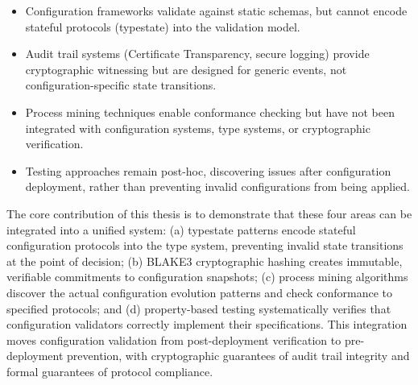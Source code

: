 \begin{itemize}
    \item Configuration frameworks validate against static schemas, but cannot encode stateful protocols (typestate) into the validation model.

    \item Audit trail systems (Certificate Transparency, secure logging) provide cryptographic witnessing but are designed for generic events, not configuration-specific state transitions.

    \item Process mining techniques enable conformance checking but have not been integrated with configuration systems, type systems, or cryptographic verification.

    \item Testing approaches remain post-hoc, discovering issues after configuration deployment, rather than preventing invalid configurations from being applied.
\end{itemize}

The core contribution of this thesis is to demonstrate that these four areas can be integrated into a unified system: (a) typestate patterns encode stateful configuration protocols into the type system, preventing invalid state transitions at the point of decision; (b) BLAKE3 cryptographic hashing creates immutable, verifiable commitments to configuration snapshots; (c) process mining algorithms discover the actual configuration evolution patterns and check conformance to specified protocols; and (d) property-based testing systematically verifies that configuration validators correctly implement their specifications. This integration moves configuration validation from post-deployment verification to pre-deployment prevention, with cryptographic guarantees of audit trail integrity and formal guarantees of protocol compliance.

